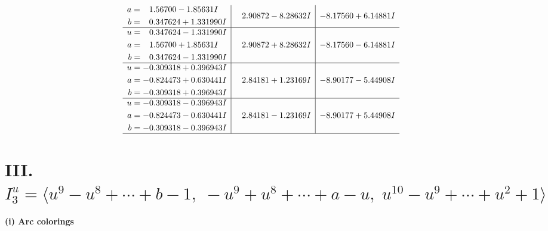 \documentclass[1p]{elsarticle_modified}
\theoremstyle{definition}
\begin{document}
$$\begin{array}{c|c|c}
\begin{aligned}
a &= \phantom{-}1.56700 - 1.85631 I \\
b &= \phantom{-}0.347624 + 1.331990 I\end{aligned}
 & \phantom{-}2.90872 - 8.28632 I & -8.17560 + 6.14881 I \\ \hline\begin{aligned}
u &= \phantom{-}0.347624 - 1.331990 I \\
a &= \phantom{-}1.56700 + 1.85631 I \\
b &= \phantom{-}0.347624 - 1.331990 I\end{aligned}
 & \phantom{-}2.90872 + 8.28632 I & -8.17560 - 6.14881 I \\ \hline\begin{aligned}
u &= -0.309318 + 0.396943 I \\
a &= -0.824473 + 0.630441 I \\
b &= -0.309318 + 0.396943 I\end{aligned}
 & \phantom{-}2.84181 + 1.23169 I & -8.90177 - 5.44908 I \\ \hline\begin{aligned}
u &= -0.309318 - 0.396943 I \\
a &= -0.824473 - 0.630441 I \\
b &= -0.309318 - 0.396943 I\end{aligned}
 & \phantom{-}2.84181 - 1.23169 I & -8.90177 + 5.44908 I\\
 \hline 
 \end{array}$$\newpage\newpage\renewcommand{\arraystretch}{1}
\centering \section*{III. $I^u_{3}= \langle u^9- u^8+\cdots+b-1,\;- u^9+u^8+\cdots+a- u,\;u^{10}- u^9+\cdots+u^2+1 \rangle$}
\flushleft \textbf{(i) Arc colorings}\\
\end{document}
